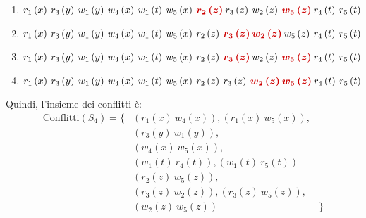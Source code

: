 \documentclass[a4paper]{article}
\begin{document}
\begin{enumerate}
		\item $r_{1}\left(x\right) \: r_{3}\left(y\right) \: w_{1}\left(y\right) \: w_{4}\left(x\right) \: w_{1}\left(t\right) \: w_{5}\left(x\right) \: \textcolor{Red3}{\boldsymbol{r_{2}\left(z\right)} \: }r_{3}\left(z\right) \: w_{2}\left(z\right) \: \textcolor{Red3}{\boldsymbol{w_{5}\left(z\right)} \: }r_{4}\left(t\right) \: r_{5}\left(t\right)$
		
		\item $r_{1}\left(x\right) \: r_{3}\left(y\right) \: w_{1}\left(y\right) \: w_{4}\left(x\right) \: w_{1}\left(t\right) \: w_{5}\left(x\right) \: r_{2}\left(z\right) \: \textcolor{Red3}{\boldsymbol{r_{3}\left(z\right)} \: }\textcolor{Red3}{\boldsymbol{w_{2}\left(z\right)} \: }w_{5}\left(z\right) \: r_{4}\left(t\right) \: r_{5}\left(t\right)$
		
		\item $r_{1}\left(x\right) \: r_{3}\left(y\right) \: w_{1}\left(y\right) \: w_{4}\left(x\right) \: w_{1}\left(t\right) \: w_{5}\left(x\right) \: r_{2}\left(z\right) \: \textcolor{Red3}{\boldsymbol{r_{3}\left(z\right)} \: }w_{2}\left(z\right) \: \textcolor{Red3}{\boldsymbol{w_{5}\left(z\right)} \: }r_{4}\left(t\right) \: r_{5}\left(t\right)$
		
		\item $r_{1}\left(x\right) \: r_{3}\left(y\right) \: w_{1}\left(y\right) \: w_{4}\left(x\right) \: w_{1}\left(t\right) \: w_{5}\left(x\right) \: r_{2}\left(z\right) \: r_{3}\left(z\right) \: \textcolor{Red3}{\boldsymbol{w_{2}\left(z\right)} \: } \textcolor{Red3}{\boldsymbol{w_{5}\left(z\right)} \: } r_{4}\left(t\right) \: r_{5}\left(t\right)$
	\end{enumerate}
	Quindi, l'insieme dei conflitti è:
	\begin{equation*}
		\begin{array}{lll}
			\text{Conflitti}\left(S_{4}\right) = \{ & \left(r_{1}\left(x\right) \: w_{4}\left(x\right)\right), \left(r_{1}\left(x\right) \: w_{5}\left(x\right)\right), & \\ [0.5em]
													& \left(r_{3}\left(y\right) \: w_{1}\left(y\right)\right), & \\ [0.5em]
													& \left(w_{4}\left(x\right) \: w_{5}\left(x\right)\right), & \\ [0.5em]
													& \left(w_{1}\left(t\right) \: r_{4}\left(t\right)\right), \left(w_{1}\left(t\right) \: r_{5}\left(t\right)\right) & \\ [0.5em]
													& \left(r_{2}\left(z\right) \: w_{5}\left(z\right)\right), & \\ [0.5em]
													& \left(r_{3}\left(z\right) \: w_{2}\left(z\right)\right), \left(r_{3}\left(z\right) \: w_{5}\left(z\right)\right), & \\ [0.5em]
													& \left(w_{2}\left(z\right) \: w_{5}\left(z\right)\right) & \}
		\end{array}
	\end{equation*}\newpage
\end{document}
